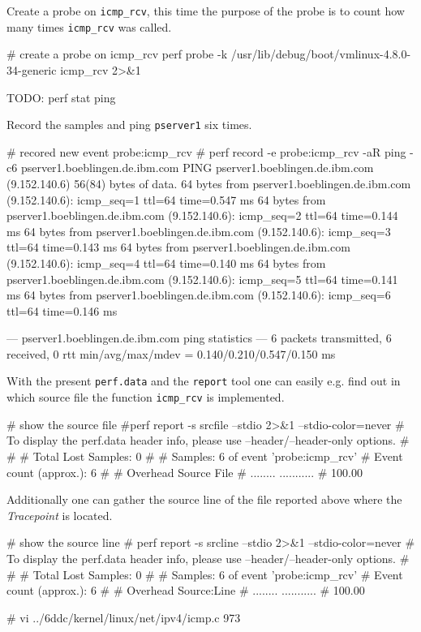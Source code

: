 Create a probe on {\tt icmp_rcv}, this time the purpose of the probe is to count
how many times {\tt icmp_rcv} was called.

\starttyping
# create a probe on icmp_rcv
perf probe -k /usr/lib/debug/boot/vmlinux-4.8.0-34-generic   icmp_rcv 2>&1
\stoptyping

\starttyping
TODO: perf stat ping
\stoptyping

Record the samples and ping {\tt pserver1} six times.

\starttyping
# recored new event probe:icmp_rcv
# perf record -e probe:icmp_rcv -aR ping -c6 pserver1.boeblingen.de.ibm.com
PING pserver1.boeblingen.de.ibm.com (9.152.140.6) 56(84) bytes of data.
64 bytes from pserver1.boeblingen.de.ibm.com (9.152.140.6): icmp_seq=1 ttl=64 time=0.547 ms
64 bytes from pserver1.boeblingen.de.ibm.com (9.152.140.6): icmp_seq=2 ttl=64 time=0.144 ms
64 bytes from pserver1.boeblingen.de.ibm.com (9.152.140.6): icmp_seq=3 ttl=64 time=0.143 ms
64 bytes from pserver1.boeblingen.de.ibm.com (9.152.140.6): icmp_seq=4 ttl=64 time=0.140 ms
64 bytes from pserver1.boeblingen.de.ibm.com (9.152.140.6): icmp_seq=5 ttl=64 time=0.141 ms
64 bytes from pserver1.boeblingen.de.ibm.com (9.152.140.6): icmp_seq=6 ttl=64 time=0.146 ms

--- pserver1.boeblingen.de.ibm.com ping statistics ---
6 packets transmitted, 6 received, 0%
rtt min/avg/max/mdev = 0.140/0.210/0.547/0.150 ms
\stoptyping


With the present {\tt perf.data} and the {\tt report} tool one can easily e.g.
find out in which source file the function {\tt icmp_rcv} is implemented.

\starttyping
# show the source file
#perf report -s srcfile --stdio 2>&1 --stdio-color=never
# To display the perf.data header info, please use --header/--header-only options.
#
#
# Total Lost Samples: 0
#
# Samples: 6  of event 'probe:icmp_rcv'
# Event count (approx.): 6
#
# Overhead  Source File
# ........  ...........
#
  100.00%


\stoptyping

Additionally one can gather the source line of the file reported above
where the {\em Tracepoint} is located.

\starttyping
# show the source line
# perf report -s srcline --stdio 2>&1 --stdio-color=never
# To display the perf.data header info, please use --header/--header-only options.
#
#
# Total Lost Samples: 0
#
# Samples: 6  of event 'probe:icmp_rcv'
# Event count (approx.): 6
#
# Overhead  Source:Line
# ........  ...........
#
  100.00%


\stoptyping

\starttyping
# vi ../6ddc/kernel/linux/net/ipv4/icmp.c 973
\stoptyping
